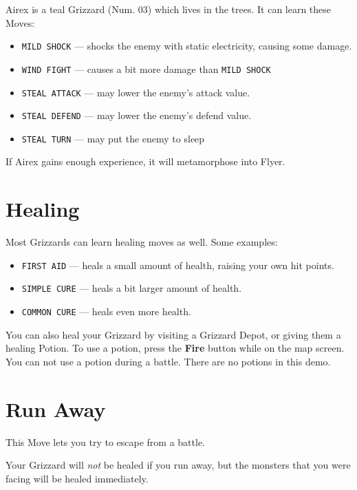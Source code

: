 \documentclass[10pt,twocolumn,openany,article]{memoir}
\begin{document}
Airex is  a teal  Grizzard (Num. 03)  which lives in  the trees.  It can
learn these Moves:

\begin{itemize}
\item \texttt{MILD SHOCK} --- shocks  the enemy with static electricity,
  causing some damage.
\item \texttt{WIND FIGHT} --- causes a bit more damage than \texttt{MILD SHOCK}
\item \texttt{STEAL ATTACK} --- may lower the enemy's attack value.
\item \texttt{STEAL DEFEND} --- may lower the enemy's defend value.
\item \texttt{STEAL TURN} --- may put the enemy to sleep
\end{itemize}

If Airex gains enough experience, it will metamorphose into Flyer.

\fi

\section{Healing}

Most Grizzards can learn healing moves as well. Some examples:

\begin{itemize}
\item \texttt{FIRST  AID} ---  heals a small  amount of  health, raising
  your own hit points.
\item \texttt{SIMPLE CURE} --- heals a bit larger amount of health.
\item \texttt{COMMON CURE} --- heals even more health.
\end{itemize}

You can also heal your Grizzard  by visiting a Grizzard Depot, or giving
them a healing  Potion. To use a potion, press  the \textbf{Fire} button
while on  the map  screen. You  can not  use a  potion during  a battle.
\ifdefined\DEMO There are no potions in this demo. \fi

\section{Run Away}

This Move lets you try to escape from a battle.

Your  Grizzard will  \emph{not}  be  healed if  you  run  away, but  the
monsters that you were facing will be healed immediately.
\end{document}
